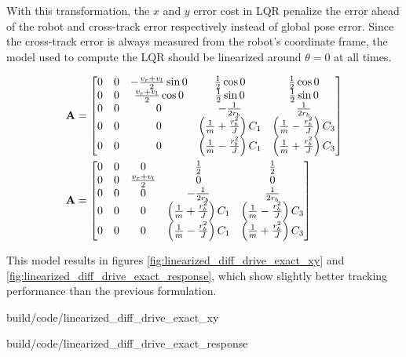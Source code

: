 With this transformation, the $x$ and $y$ error cost in LQR penalize the error
ahead of the robot and cross-track error respectively instead of global pose
error. Since the cross-track error is always measured from the robot's
coordinate frame, the \gls{model} used to compute the LQR should be linearized
around $\theta = 0$ at all times.

\begin{align*}
  \mathbf{A} &=
  \begin{bmatrix}
    0 & 0 & -\frac{v_r + v_l}{2}\sin 0 & \frac{1}{2}\cos 0 &
      \frac{1}{2}\cos 0 \\
    0 & 0 & \frac{v_r + v_l}{2}\cos 0 & \frac{1}{2}\sin 0 &
      \frac{1}{2}\sin 0 \\
    0 & 0 & 0 & -\frac{1}{2r_b} & \frac{1}{2r_b} \\
    0 & 0 & 0 & \left(\frac{1}{m} + \frac{r_b^2}{J}\right) C_1 &
      \left(\frac{1}{m} - \frac{r_b^2}{J}\right) C_3 \\
    0 & 0 & 0 & \left(\frac{1}{m} - \frac{r_b^2}{J}\right) C_1 &
      \left(\frac{1}{m} + \frac{r_b^2}{J}\right) C_3
  \end{bmatrix} \\
  \mathbf{A} &=
  \begin{bmatrix}
    0 & 0 & 0 & \frac{1}{2} & \frac{1}{2} \\
    0 & 0 & \frac{v_r + v_l}{2} & 0 & 0 \\
    0 & 0 & 0 & -\frac{1}{2r_b} & \frac{1}{2r_b} \\
    0 & 0 & 0 & \left(\frac{1}{m} + \frac{r_b^2}{J}\right) C_1 &
      \left(\frac{1}{m} - \frac{r_b^2}{J}\right) C_3 \\
    0 & 0 & 0 & \left(\frac{1}{m} - \frac{r_b^2}{J}\right) C_1 &
      \left(\frac{1}{m} + \frac{r_b^2}{J}\right) C_3
  \end{bmatrix}
\end{align*}

This \gls{model} results in figures \ref{fig:linearized_diff_drive_exact_xy} and
\ref{fig:linearized_diff_drive_exact_response}, which show slightly better
tracking performance than the previous formulation.

\begin{bookfigure}
  \begin{minisvg}{build/code/linearized_diff_drive_exact_xy}
    \caption{Linearized differential drive controller x-y plot}
    \label{fig:linearized_diff_drive_exact_xy}
  \end{minisvg}
  \hfill
  \begin{minisvg}{build/code/linearized_diff_drive_exact_response}
    \caption{Linearized differential drive controller response}
    \label{fig:linearized_diff_drive_exact_response}
  \end{minisvg}
\end{bookfigure}

